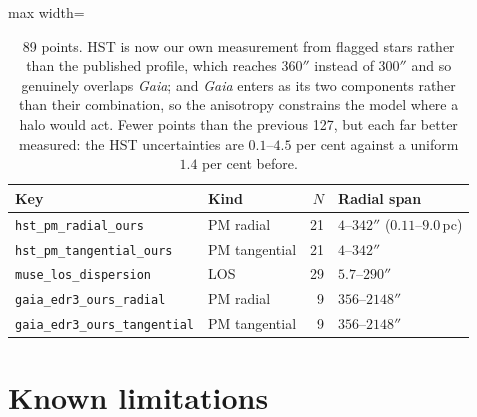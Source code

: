 \documentclass[11pt,a4paper]{article}
\begin{document}
\begin{table}[h]
\centering\small
\begin{adjustbox}{max width=\linewidth}
\begin{tabular}{llrl}
\toprule
Key & Kind & $N$ & Radial span \\
\midrule
\texttt{hst\_pm\_radial\_ours} & PM radial & 21 & $4$--$342''$ ($0.11$--$9.0$\,pc) \\
\texttt{hst\_pm\_tangential\_ours} & PM tangential & 21 & $4$--$342''$ \\
\texttt{muse\_los\_dispersion} & LOS & 29 & $5.7$--$290''$ \\
\texttt{gaia\_edr3\_ours\_radial} & PM radial & 9 & $356$--$2148''$ \\
\texttt{gaia\_edr3\_ours\_tangential} & PM tangential & 9 & $356$--$2148''$ \\
\bottomrule
\end{tabular}
\end{adjustbox}
\caption{89 points. HST is now our own measurement from flagged stars rather than the
published profile, which reaches $360''$ instead of $300''$ and so genuinely overlaps
\emph{Gaia}; and \emph{Gaia} enters as its two components rather than their combination, so
the anisotropy constrains the model where a halo would act. Fewer points than the previous
127, but each far better measured: the HST uncertainties are $0.1$--$4.5$ per cent against a
uniform $1.4$ per cent before.}
\end{table}

\section{Known limitations}
\end{document}
